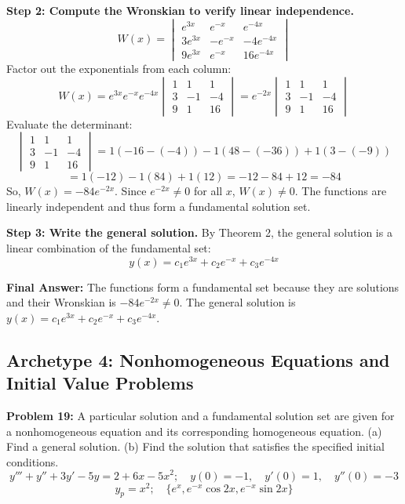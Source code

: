 \documentclass[11pt,letterpaper]{article}
\begin{document}
\textbf{Step 2: Compute the Wronskian to verify linear independence.}
\[ W(x) = \begin{vmatrix} e^{3x} & e^{-x} & e^{-4x} \\ 3e^{3x} & -e^{-x} & -4e^{-4x} \\ 9e^{3x} & e^{-x} & 16e^{-4x} \end{vmatrix} \]
Factor out the exponentials from each column:
\[ W(x) = e^{3x}e^{-x}e^{-4x} \begin{vmatrix} 1 & 1 & 1 \\ 3 & -1 & -4 \\ 9 & 1 & 16 \end{vmatrix} = e^{-2x} \begin{vmatrix} 1 & 1 & 1 \\ 3 & -1 & -4 \\ 9 & 1 & 16 \end{vmatrix} \]
Evaluate the determinant:
\[ \begin{vmatrix} 1 & 1 & 1 \\ 3 & -1 & -4 \\ 9 & 1 & 16 \end{vmatrix} = 1(-16 - (-4)) - 1(48 - (-36)) + 1(3 - (-9)) \]
\[ = 1(-12) - 1(84) + 1(12) = -12 - 84 + 12 = -84 \]
So, $W(x) = -84e^{-2x}$. Since $e^{-2x} \neq 0$ for all $x$, $W(x) \neq 0$. The functions are linearly independent and thus form a fundamental solution set.

\textbf{Step 3: Write the general solution.}
By Theorem 2, the general solution is a linear combination of the fundamental set:
\[ y(x) = c_1 e^{3x} + c_2 e^{-x} + c_3 e^{-4x} \]

\textbf{Final Answer:} The functions form a fundamental set because they are solutions and their Wronskian is $-84e^{-2x} \neq 0$. The general solution is $y(x) = c_1 e^{3x} + c_2 e^{-x} + c_3 e^{-4x}$.

\subsection{Archetype 4: Nonhomogeneous Equations and Initial Value Problems}

\textbf{Problem 19:} A particular solution and a fundamental solution set are given for a nonhomogeneous equation and its corresponding homogeneous equation. (a) Find a general solution. (b) Find the solution that satisfies the specified initial conditions.
\[ y''' + y'' + 3y' - 5y = 2 + 6x - 5x^2; \quad y(0) = -1, \quad y'(0) = 1, \quad y''(0) = -3 \]
\[ y_p = x^2; \quad \{e^x, e^{-x}\cos 2x, e^{-x}\sin 2x\} \]
\end{document}
